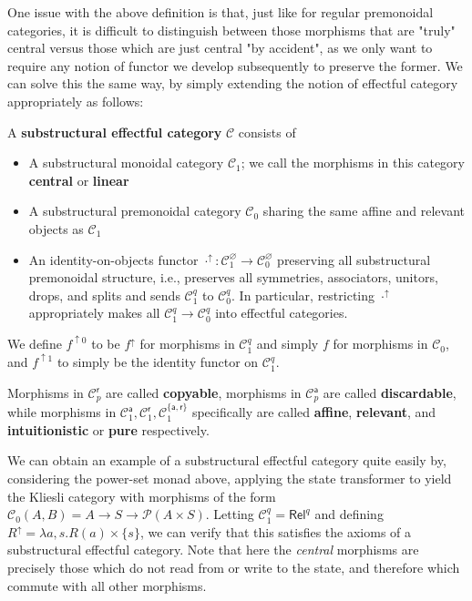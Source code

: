\documentclass[acmsmall,screen,review]{acmart}
\newcommand{\mc}[1]{\ensuremath{\mathcal{#1}}}
\newcommand{\ms}[1]{\ensuremath{\mathsf{#1}}}
\newcommand{\upg}[2]{{#1}^{\uparrow #2}}
\begin{document}
One issue with the above definition is that, just like for regular premonoidal
categories, it is difficult to distinguish between those morphisms that are
"truly" central versus those which are just central "by accident", as we only
want to require any notion of functor we develop subsequently to preserve the
former. We can solve this the same way, by simply extending the notion of
effectful category appropriately as follows:
\begin{definition}
  A \textbf{substructural effectful category} \(\mc{C}\) consists of
  \begin{itemize}
    \item A substructural monoidal category \(\mc{C}_1\); we call the morphisms
    in this category \textbf{central} or \textbf{linear}
    \item A substructural premonoidal category \(\mc{C}_0\) sharing the same
    affine and relevant objects as \(\mc{C}_1\)
    \item An identity-on-objects functor \(\upg{\cdot}{}: \mc{C}_1^\varnothing
    \to \mc{C}_0^\varnothing\) preserving all substructural premonoidal
    structure, i.e., preserves all symmetries, associators, unitors, drops, and
    splits and sends \(\mc{C}_1^q\) to \(\mc{C}_0^q\). In particular,
    restricting \(\upg{\cdot}{}\) appropriately makes all \(\mc{C}_1^q \to
    \mc{C}_0^q\) into effectful categories.
  \end{itemize}
  We define \(\upg{f}{0}\) to be \(\upg{f}{}\) for morphisms in \(\mc{C}_1^q\)
  and simply \(f\) for morphisms in \(\mc{C}_0\), and \(\upg{f}{1}\) to simply
  be the identity functor on \(\mc{C}_1^q\).
 
  Morphisms in \(\mc{C}_p^{\ms{r}}\) are called \textbf{copyable}, morphisms
  in \(\mc{C}_p^{\ms{a}}\) are called \textbf{discardable}, while morphisms
  in \(\mc{C}_1^{\ms{a}}, \mc{C}_1^{\ms{r}}, \mc{C}_1^{\{\ms{a},
  \ms{r}\}}\) specifically are called \textbf{affine}, \textbf{relevant}, and
  \textbf{intuitionistic} or \textbf{pure} respectively.
\end{definition}
We can obtain an example of a substructural effectful category quite easily by,
considering the power-set monad above, applying the state transformer to yield
the Kliesli category with morphisms of the form \(\mc{C}_0(A, B) = A \to S \to
\mc{P}(A \times S)\). Letting \(\mc{C}_1^q = \ms{Rel}^q\) and defining
\(\upg{R}{} = \lambda a, s. R(a) \times \{s\}\), we can verify that this
satisfies the axioms of a substructural effectful category. Note that here the
\textit{central} morphisms are precisely those which do not read from or write
to the state, and therefore which commute with all other morphisms.
\end{document}
